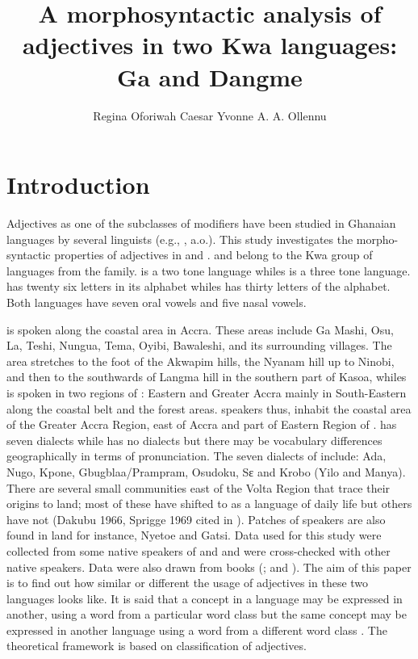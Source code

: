 \documentclass[output=paper,
modfonts
]{langscibook}
\title{A morphosyntactic analysis of adjectives in two Kwa languages: Ga and Dangme}
\author{Regina Oforiwah Caesar\affiliation{University of Education, Winneba, Ghana}\lastand 
Yvonne A. A. Ollennu\affiliation{University of Education, Winneba, Ghana}}
\begin{document}
\maketitle

\section{Introduction} 
Adjectives as one of the subclasses of modifiers have been studied in Ghanaian languages by several linguists (e.g., \citealt{Osam2003,Ameka2003,Otoo2005,Adjei2007,Amfo2007,Danti2007,Dzameshie2007,Naden2007,PokuaaEtAl2007,Caesar2013}, a.o.). This study investigates the morpho-syntactic properties of adjectives in  and .  and  belong to the Kwa group of languages from the   family.  is a two tone language whiles  is a three tone language.  has twenty six letters in its alphabet whiles  has thirty letters of the alphabet. Both languages have seven oral vowels and five nasal vowels. 



 is spoken along the coastal area in Accra. These areas include Ga  {Mashi}, Osu, La, Teshi, Nungua, Tema, Oyibi, Bawaleshi, and its surrounding villages. The area stretches to the foot of the Akwapim hills, the Nyanam hill up to Ninobi, and then to the southwards of Langma hill in the southern part of Kasoa, whiles  is spoken in two regions of : Eastern and Greater Accra mainly in South-Eastern  along the coastal belt and the forest areas.  speakers thus, inhabit the coastal area of the Greater Accra Region, east of Accra and part of Eastern Region of .  has seven dialects while  has no dialects but there may be vocabulary differences geographically in terms of pronunciation. The seven dialects of  include: Ada, Nugo, Kpone, Gbugblaa/Prampram, Osudoku, Sɛ and Krobo (Yilo and Manya). There are several small communities east of the Volta Region that trace their origins to  land; most of these have shifted to  as a language of daily life but others have not (Dakubu 1966, Sprigge 1969 cited in \citealt{Ameka2008}). Patches of speakers are also found in  land for instance, Nyetoe and Gatsi. Data used for this study were collected from some native speakers of  and  and were cross-checked with other native speakers. Data were also drawn from books (\citealt{Ablorh-Odjidjah1961,Dakubu1987,Dakubu2000,Adams1999,Adams2000,Amfo2007,Adi2003,Odonkor2004,Otoo2005}; and \citealt{Caesar2013}). The aim of this paper is to find out how similar or different the usage of adjectives in these two languages looks like. It is said that a concept in a language may be expressed in another, using a word from a particular word class but the same concept may be expressed in another language using a word from a different word class \citep{Dixon1977,Dixon1982,Dixon2004}. The theoretical framework is based on  classification of adjectives. 
\end{document}
